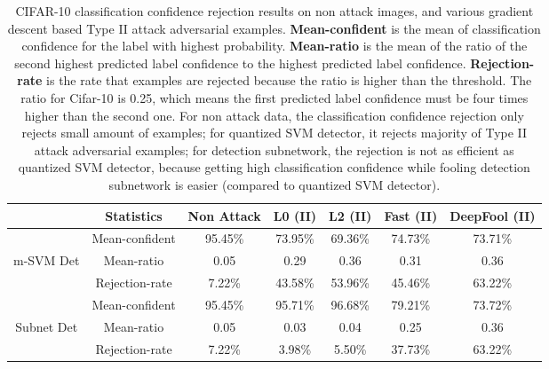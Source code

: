 \documentclass[10pt,twocolumn,letterpaper]{article}
\begin{document}
\begin{table*}[h!]
\begin{center}
\resizebox{0.75\textwidth}{!}
{
\begin{tabular}{  c | c | c | c | c | c | c }
 & Statistics & Non Attack & L0 (II) & L2 (II) & Fast (II) & DeepFool (II) \\
\hline
	& Mean-confident & 95.45\% & 73.95\% & 69.36\% & 74.73\% & 73.71\% \\
m-SVM Det & Mean-ratio & 0.05 & 0.29 & 0.36 & 0.31 & 0.36 \\
	& Rejection-rate & 7.22\% & 43.58\% & 53.96\% & 45.46\% & 63.22\% \\
\hline
	& Mean-confident & 95.45\% & 95.71\% & 96.68\% & 79.21\% & 73.72\% \\
Subnet Det	& Mean-ratio & 0.05 & 0.03 & 0.04 & 0.25 & 0.36 \\
	& Rejection-rate & 7.22\% & 3.98\% & 5.50\% & 37.73\% & 63.22\% \\
\end{tabular}
}
\caption{CIFAR-10 classification confidence rejection results on non attack images, and various gradient descent based Type II attack adversarial examples. 
\textbf{Mean-confident} is the mean of classification confidence for the label with highest probability.
\textbf{Mean-ratio} is the mean of the ratio of the second highest predicted label confidence to the highest predicted label confidence.
\textbf{Rejection-rate} is the rate that examples are rejected because the ratio is higher than the threshold. The ratio for Cifar-10 is 0.25, which means the first predicted label 
confidence must be four times higher than the second one. For non attack data, the classification confidence rejection only rejects small amount of examples; for  quantized SVM 
detector, it rejects majority of Type II attack adversarial examples; for detection subnetwork, the rejection is not as efficient as quantized SVM detector, because getting high 
classification confidence while fooling detection subnetwork is easier (compared to quantized SVM detector). }
\label{tb:rej_cifar}
\end{center}
\vspace{-0.05in}
\end{table*}
\end{document}

